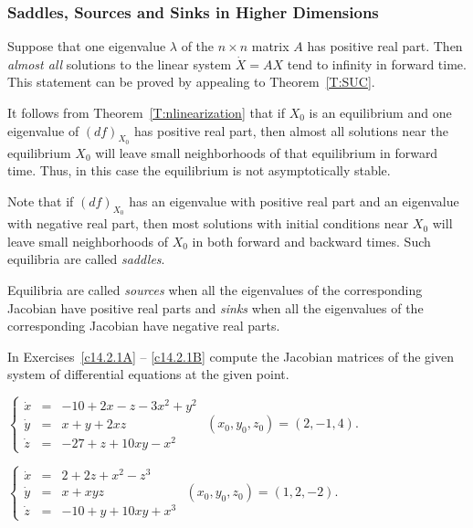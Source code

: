 \subsubsection*{Saddles, Sources and Sinks in Higher Dimensions}

Suppose that one eigenvalue $\lambda$ of the $n\times n$ matrix $A$ has 
positive real part.  Then {\em almost all\/} solutions to the linear system 
$\dot{X}=AX$ tend to infinity in forward time.  This 
statement can be proved by appealing to Theorem~\ref{T:SUC}.    

It follows from Theorem~\ref{T:nlinearization} that if $X_0$ is an
equilibrium and one eigenvalue of $(df)_{X_0}$ has positive 
real part, then almost all solutions near the equilibrium $X_0$ will leave 
small neighborhoods of that equilibrium in forward time.  Thus, in this case 
the equilibrium is not asymptotically stable.

Note that if $(df)_{X_0}$ has an eigenvalue with positive real part and an
eigenvalue with negative real part, then most solutions with initial
conditions near $X_0$ will leave small neighborhoods of $X_0$ in both forward
and backward times.  Such equilibria are called {\em saddles\/}.

Equilibria are called {\em sources\/} when all the eigenvalues 
of the corresponding Jacobian have positive real parts and 
{\em sinks\/} when all the eigenvalues of the corresponding 
Jacobian have negative real parts.



\EXER

\TEXER  

\noindent In Exercises~\ref{c14.2.1A} -- \ref{c14.2.1B} compute the Jacobian 
matrices of the given system of differential equations at the given point.
\begin{exercise} \label{c14.2.1A}
$\left\{\begin{array}{rcl} 
\dot{x} & = & -10 + 2x - z - 3x^2+y^2 \\
\dot{y} & = & x + y + 2xz \\
\dot{z} & = & -27 + z + 10xy - x^2  \end{array}\right.$ 
\AND $(x_0,y_0,z_0) = (2,-1,4)$.
\end{exercise}
\begin{exercise} \label{c14.2.1B}
$\left\{\begin{array}{rcl} 
\dot{x} & = & 2 + 2z + x^2 - z^3 \\
\dot{y} & = & x + xyz \\
\dot{z} & = & -10 + y + 10xy + x^3  \end{array}\right.$ 
\AND $(x_0,y_0,z_0) = (1,2,-2)$.
\end{exercise}

